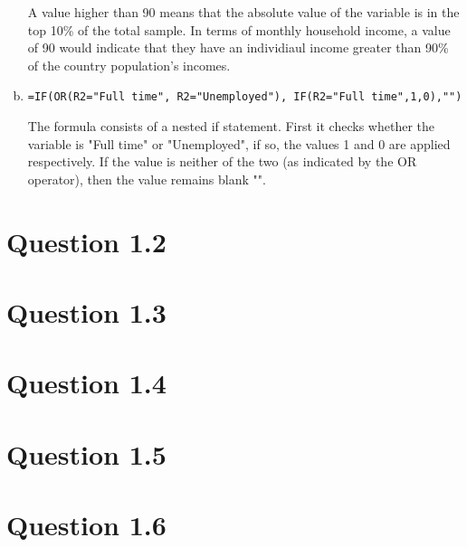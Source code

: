 \documentclass{article}
\newcommand{\formula}[1]{\small\texttt{#1}\normalsize}
\newcommand{\itemspace}{\vspace{1em}\item}
\begin{document}
\begin{enumerate}[a)]
    A value higher than 90 means that the absolute value of the variable is in
    the top 10\% of the total sample. In terms of monthly household income, a
    value of 90 would indicate that they have an individiaul income greater
    than 90\% of the country population's incomes.
    
  \itemspace 

     \par 
    
    \formula{=IF(OR(R2="Full time", R2="Unemployed"), IF(R2="Full
    time",1,0),"")} \par
    
     \par 

    The formula consists of a nested if statement. First it checks whether the
    variable is "Full time" or "Unemployed", if so, the values 1 and 0 are
    applied respectively. If the value is neither of the two (as indicated by
    the OR operator), then the value remains blank "". 
\end{enumerate}

\section{Question 1.2}

\section{Question 1.3}
\section{Question 1.4}
\section{Question 1.5}

\section{Question 1.6}
\end{document}
